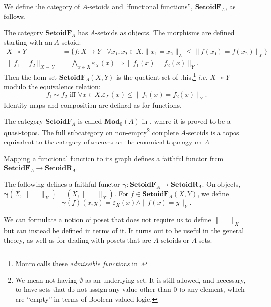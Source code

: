 \documentclass{lmcs}
\newcommand{\cat}[1]{\ensuremath{\mathbf{#1}}}
\newcommand{\homoid}{\multimap} %
\newcommand{\beq}{\|\mbox{$=$}\|}
\newcommand{\inn}{\varepsilon}
\newcommand{\graph}{\pmb{\gamma}}
\newcommand{\SetoidR}{\cat{SetoidR}}
\newcommand{\SetoidF}{\cat{SetoidF}}
\begin{document}
We define the category of $A$-setoids and ``functional functions'', $\SetoidF_A$, as follows. 
\begin{defi}
	\label{SetoidFDef}
	The category $\SetoidF_A$ has $A$-setoids as objects. The morphisms are defined starting with an $A$-setoid:
	\begin{align*}
		X \homoid Y &= \{ f : X \rightarrow Y \mid \forall x_1,x_2 \in X. \|x_1= x_2\|_X \leq \|f(x_1) = f(x_2)\|_Y \} \\
		\| f_1 = f_2 \|_{X \homoid Y} &= \bigwedge_{x \in X} \inn_X(x) \Rightarrow \| f_1(x) = f_2(x) \|_Y.
	\end{align*}
	Then the hom set $\SetoidF_A(X,Y)$ is the quotient set of this,\footnote{Monro calls these \emph{admissible functions} in \cite[Definition 5.2]{monroA}.} \emph{i.e.} $X \homoid Y$ modulo the equivalence relation:
	\[
	f_1 \sim f_2 \text{ iff } \forall x \in X. \inn_X(x) \leq \| f_1(x) = f_2(x) \|_Y.
	\]
	Identity maps and composition are defined as for functions. \qedhere
\end{defi}

The category $\SetoidF_A$ is called $\cat{Mod}_0(A)$ in \cite[Definition 5.2]{monroA}, where it is proved to be a quasi-topos. The full subcategory on non-empty\footnote{We mean not having $\emptyset$ as an underlying set. It is still allowed, and necessary, to have sets that do not assign any value other than $0$ to any element, which are ``empty'' in terms of Boolean-valued logic.} complete $A$-setoids is a topos \cite[Proposition 5.6 (ii)]{monroA} equivalent to the category of sheaves on the canonical topology on $A$. 


Mapping a functional function to its graph defines a faithful functor from $\SetoidF_A \rightarrow \SetoidR_A$.
\begin{defi}
	\label{FloorFunDef}
	The following defines a faithful functor $\graph : \SetoidF_A \rightarrow \SetoidR_A$. On objects, $\graph(X,\beq_X) = (X,\beq_X)$. For $f \in \SetoidF_A(X,Y)$, we define
	\[
	\graph(f)(x,y) = \inn_X(x) \land \| f(x) = y \|_Y.
	\]
\qedhere
\end{defi}

We can formulate a notion of poset that does not require us to define $\beq_X$ but can instead be defined in terms of it. It turns out to be useful in the general theory, as well as for dealing with posets that are $A$-setoids or $A$-sets. 
\end{document}

